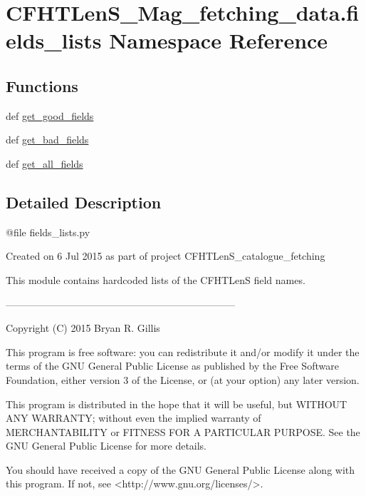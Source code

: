 \hypertarget{namespaceCFHTLenS__Mag__fetching__data_1_1fields__lists}{}\section{C\+F\+H\+T\+Len\+S\+\_\+\+Mag\+\_\+fetching\+\_\+data.\+fields\+\_\+lists Namespace Reference}
\label{namespaceCFHTLenS__Mag__fetching__data_1_1fields__lists}
\subsection*{Functions}
\begin{DoxyCompactItemize}
\item 
def \hyperlink{namespaceCFHTLenS__Mag__fetching__data_1_1fields__lists_ab74f5024e79c971ece9580d3637d22a4}{get\+\_\+good\+\_\+fields}
\item 
def \hyperlink{namespaceCFHTLenS__Mag__fetching__data_1_1fields__lists_a0d0cdfbac7217965c0884213c567b75c}{get\+\_\+bad\+\_\+fields}
\item 
def \hyperlink{namespaceCFHTLenS__Mag__fetching__data_1_1fields__lists_a872d360bad7302ea510e9d81ad04fc2f}{get\+\_\+all\+\_\+fields}
\end{DoxyCompactItemize}


\subsection{Detailed Description}
\begin{DoxyVerb}@file fields_lists.py

    Created on 6 Jul 2015 as part of project CFHTLenS_catalogue_fetching
    
    This module contains hardcoded lists of the CFHTLenS field names.

    ---------------------------------------------------------------------

    Copyright (C) 2015  Bryan R. Gillis

    This program is free software: you can redistribute it and/or modify
     it under the terms of the GNU General Public License as published by
     the Free Software Foundation, either version 3 of the License, or
     (at your option) any later version.

     This program is distributed in the hope that it will be useful,
     but WITHOUT ANY WARRANTY; without even the implied warranty of
     MERCHANTABILITY or FITNESS FOR A PARTICULAR PURPOSE.  See the
     GNU General Public License for more details.

    You should have received a copy of the GNU General Public License
    along with this program.  If not, see <http://www.gnu.org/licenses/>.\end{DoxyVerb}
 

